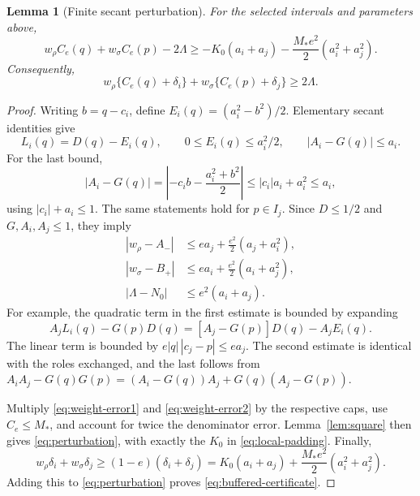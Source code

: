 \documentclass[11pt]{amsart}
\newtheorem{lemma}[theorem]{Lemma}
\theoremstyle{definition}
\theoremstyle{remark}
\begin{document}
\begin{lemma}[Finite secant perturbation]\label{lem:perturbation}
For the selected intervals and parameters above,
\begin{equation}\label{eq:perturbation}
 w_\rho C_e(q)+w_\sigma C_e(p)-2\Lambda
 \ge-K_0(a_i+a_j)-\frac{M_*e^2}{2}(a_i^2+a_j^2).
\end{equation}
Consequently,
\begin{equation}\label{eq:buffered-certificate}
 w_\rho\{C_e(q)+\delta_i\}
 +w_\sigma\{C_e(p)+\delta_j\}\ge2\Lambda.
\end{equation}
\end{lemma}
\begin{proof}
Writing $b=q-c_i$, define $E_i(q)=(a_i^2-b^2)/2$. Elementary
secant identities give
\begin{equation}\label{eq:secant-errors}
 L_i(q)=D(q)-E_i(q),\qquad 0\le E_i(q)\le a_i^2/2,
 \qquad |A_i-G(q)|\le a_i.
\end{equation}
For the last bound,
\[
 |A_i-G(q)|=\left|-c_ib-\frac{a_i^2+b^2}{2}\right|
 \le|c_i|a_i+a_i^2\le a_i,
\]
using $|c_i|+a_i\le1$. The same statements hold for $p\in I_j$.
Since $D\le1/2$ and $G,A_i,A_j\le1$, they imply
\begin{align}
 |w_\rho-A_-|&\le ea_j+\frac{e^2}{2}(a_j+a_i^2),
 \label{eq:weight-error1}\\
 |w_\sigma-B_+|&\le ea_i+\frac{e^2}{2}(a_i+a_j^2),
 \label{eq:weight-error2}\\
 |\Lambda-N_0|&\le e^2(a_i+a_j).
 \label{eq:denominator-error}
\end{align}
For example, the quadratic term in the first estimate is bounded by
expanding
\[
 A_jL_i(q)-G(p)D(q)
 =[A_j-G(p)]D(q)-A_jE_i(q).
\]
The linear term is bounded by $e|q|\,|c_j-p|\le ea_j$.
The second estimate is identical with the roles exchanged, and the last
follows from
$A_iA_j-G(q)G(p)=(A_i-G(q))A_j+G(q)(A_j-G(p))$.

Multiply \eqref{eq:weight-error1} and \eqref{eq:weight-error2} by
the respective caps, use $C_e\le M_*$, and account for twice the
denominator error. Lemma~\ref{lem:square} then gives
\eqref{eq:perturbation}, with exactly the $K_0$ in
\eqref{eq:local-padding}. Finally,
\[
 w_\rho\delta_i+w_\sigma\delta_j
 \ge(1-e)(\delta_i+\delta_j)
 =K_0(a_i+a_j)+\frac{M_*e^2}{2}(a_i^2+a_j^2).
\]
Adding this to \eqref{eq:perturbation} proves
\eqref{eq:buffered-certificate}.
\end{proof}
\end{document}
